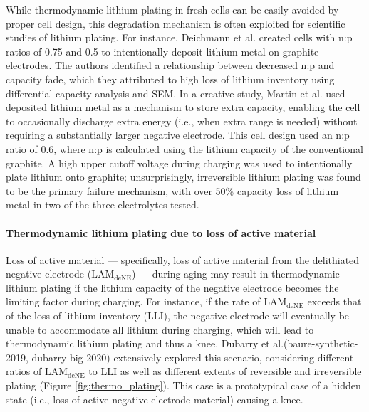 \documentclass[journal=jpcl, manuscript=article, layout=onecolumn]{achemso}
\begin{document}
While thermodynamic lithium plating in fresh cells can be easily avoided by proper cell design, this degradation mechanism is often exploited for scientific studies of lithium plating.
For instance, Deichmann et al.\cite{deichmann_investigating_2020} created cells with n:p ratios of 0.75 and 0.5 to intentionally deposit lithium metal on graphite electrodes. The authors identified a relationship between decreased n:p and capacity fade, which they attributed to high loss of lithium inventory using differential capacity analysis and SEM. In a creative study, Martin et al.\cite{martin_cycling_2020} used deposited lithium metal as a mechanism to store extra capacity, enabling the cell to occasionally discharge extra energy (i.e., when extra range is needed) without requiring a substantially larger negative electrode. This cell design used an n:p ratio of 0.6, where n:p is calculated using the lithium capacity of the conventional graphite. A high upper cutoff voltage during charging was used to intentionally plate lithium onto graphite; unsurprisingly, irreversible lithium plating was found to be the primary failure mechanism, with over 50\% capacity loss of lithium metal in two of the three electrolytes tested.

\paragraph{Thermodynamic lithium plating due to loss of active material}

Loss of active material --- specifically, loss of active material from the delithiated negative electrode ($\mathrm{LAM_{deNE}}$) --- during aging may result in thermodynamic lithium plating if the lithium capacity of the negative electrode becomes the limiting factor during charging. For instance, if the rate of $\mathrm{LAM_{deNE}}$ exceeds that of the loss of lithium inventory (LLI), the negative electrode will eventually be unable to accommodate all lithium during charging, which will lead to thermodynamic lithium plating and thus a knee. Dubarry et al.\cite{ansean_operando_2017, dubarry_durability_2018}(baure-synthetic-2019, dubarry-big-2020) extensively explored this scenario, considering different ratios of $\mathrm{LAM_{deNE}}$ to LLI as well as different extents of reversible and irreversible plating (Figure \ref{fig:thermo_plating}). This case is a prototypical case of a hidden state (i.e., loss of active negative electrode material) causing a knee.
\end{document}
